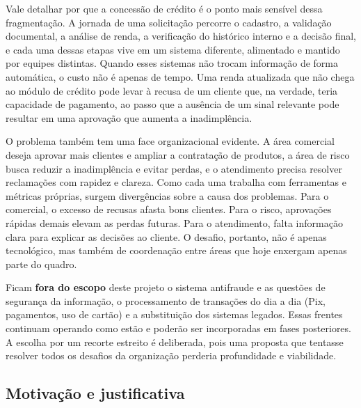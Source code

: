 \documentclass[12pt,a4paper]{article}
\begin{document}
Vale detalhar por que a concess\~ao de cr\'edito \'e o ponto mais sens\'ivel dessa fragmenta\c{c}\~ao. A jornada de uma solicita\c{c}\~ao percorre o cadastro, a valida\c{c}\~ao documental, a an\'alise de renda, a verifica\c{c}\~ao do hist\'orico interno e a decis\~ao final, e cada uma dessas etapas vive em um sistema diferente, alimentado e mantido por equipes distintas. Quando esses sistemas n\~ao trocam informa\c{c}\~ao de forma autom\'atica, o custo n\~ao \'e apenas de tempo. Uma renda atualizada que n\~ao chega ao m\'odulo de cr\'edito pode levar \`a recusa de um cliente que, na verdade, teria capacidade de pagamento, ao passo que a aus\^encia de um sinal relevante pode resultar em uma aprova\c{c}\~ao que aumenta a inadimpl\^encia.

O problema tamb\'em tem uma face organizacional evidente. A \'area comercial deseja aprovar mais clientes e ampliar a contrata\c{c}\~ao de produtos, a \'area de risco busca reduzir a inadimpl\^encia e evitar perdas, e o atendimento precisa resolver reclama\c{c}\~oes com rapidez e clareza. Como cada uma trabalha com ferramentas e m\'etricas pr\'oprias, surgem diverg\^encias sobre a causa dos problemas. Para o comercial, o excesso de recusas afasta bons clientes. Para o risco, aprova\c{c}\~oes r\'apidas demais elevam as perdas futuras. Para o atendimento, falta informa\c{c}\~ao clara para explicar as decis\~oes ao cliente. O desafio, portanto, n\~ao \'e apenas tecnol\'ogico, mas tamb\'em de coordena\c{c}\~ao entre \'areas que hoje enxergam apenas parte do quadro.

Ficam \textbf{fora do escopo} deste projeto o sistema antifraude e as quest\~oes de seguran\c{c}a da informa\c{c}\~ao, o processamento de transa\c{c}\~oes do dia a dia (Pix, pagamentos, uso de cart\~ao) e a substitui\c{c}\~ao dos sistemas legados. Essas frentes continuam operando como est\~ao e poder\~ao ser incorporadas em fases posteriores. A escolha por um recorte estreito \'e deliberada, pois uma proposta que tentasse resolver todos os desafios da organiza\c{c}\~ao perderia profundidade e viabilidade.

\subsection{Motiva\c{c}\~ao e justificativa}
\end{document}
